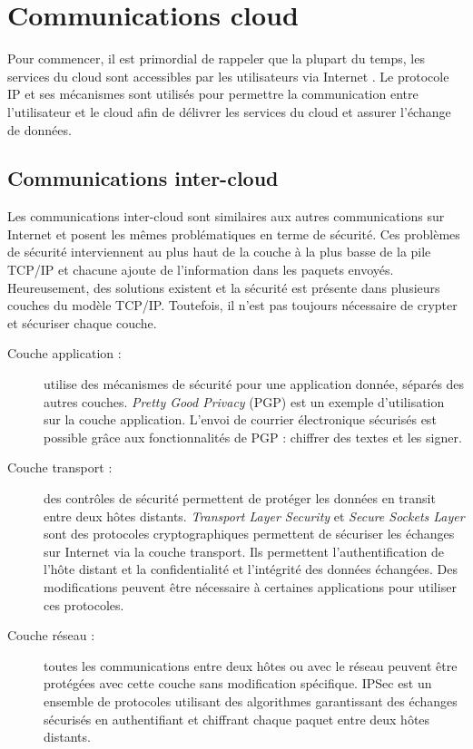 \begingroup
\renewcommand{\cleardoublepage}{}
\renewcommand{\clearpage}{}
\chapter{Communications cloud}
\endgroup

Pour commencer, il est primordial de rappeler que la plupart du temps, les services du cloud sont accessibles par les utilisateurs via Internet \cite{internet_cloud}. Le protocole IP et ses mécanismes sont utilisés pour permettre la communication entre l'utilisateur et le cloud \cite{use_ip_cloud} afin de délivrer les services du cloud et assurer l'échange de données.

\section{Communications inter-cloud}\label{sec:inter_cloud}

Les communications inter-cloud sont similaires aux autres communications sur Internet et posent les mêmes problématiques en terme de sécurité. Ces problèmes de sécurité interviennent au plus haut de la couche à la plus basse de la pile \gls{TCP/IP} et chacune ajoute de l'information dans les paquets envoyés. Heureusement, des solutions existent et la sécurité est présente dans plusieurs couches du modèle TCP/IP. Toutefois, il n'est pas toujours nécessaire de crypter et sécuriser chaque couche.

\begin{description}
	\item[Couche application :] utilise des mécanismes de sécurité pour une application donnée, séparés des autres couches. \textit{Pretty Good Privacy} (PGP) \cite{pgp} est un exemple d'utilisation sur la couche application. L'envoi de courrier électronique sécurisés est possible grâce aux fonctionnalités de PGP : chiffrer des textes et les signer.  
	\item[Couche transport :] des contrôles de sécurité permettent de protéger les données en transit entre deux hôtes distants. \textit{Transport Layer Security} \cite{tls} et \textit{Secure Sockets Layer} \cite{ssl} sont des protocoles cryptographiques permettent de sécuriser les échanges sur Internet via la couche transport. Ils permettent l'authentification de l'hôte distant et la confidentialité et l'intégrité des données échangées. Des modifications peuvent être nécessaire à certaines applications pour utiliser ces protocoles. 
	\item[Couche réseau :] toutes les communications entre deux hôtes ou avec le réseau peuvent être protégées avec cette couche sans modification spécifique. IPSec \cite{ip_security} est un ensemble de protocoles utilisant des algorithmes garantissant des échanges sécurisés en authentifiant et chiffrant chaque paquet entre deux hôtes distants.
\end{description}


